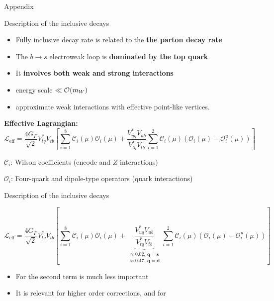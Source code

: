 \documentclass[xcolor=dvipsnames]{beamer}
\begin{document}
\begin{frame}

   \centering\Large

   Appendix

\end{frame}

\begin{frame}{Description of the inclusive decays}
   \scriptsize

   \begin{itemize}
      \item Fully inclusive decay rate is related to the \textbf{the parton decay rate}
      \item The $b\to s$ electroweak loop is \textbf{dominated by the top quark} 
      \item It \textbf{involves both weak and strong interactions}
      \item[\ra] energy scale $\ll{\ensuremath{\cal O}}(m_W)$
      \item[\ra] approximate weak interactions with effective point-like vertices.
   \end{itemize}

   \textbf{Effective Lagrangian:}
   \begin{equation}\nonumber
      \mathcal{L}_{\mathrm{eff}} = \frac{4G_F}{\sqrt{2}}V_{tq}^*V_{tb}\left[\sum^{8}_{i=1}\mathcal{C}_i(\mu)\mathcal{O}_i(\mu)
                                                  + \frac{V^*_{uq}V_{ub}}{V^*_{tq}V_{tb}}\sum^{2}_{i=1}\mathcal{C}_i(\mu)(\mathcal{O}_i(\mu)-\mathcal{O}_i^u(\mu))\right]
  \end{equation}

  \vspace{10pt}

  $\mathcal{C}_i$: Wilson coefficients (encode \Wpm and $Z$ interactions)
  
  $\mathcal{O}_i$: Four-quark and dipole-type operators (quark interactions)

\end{frame}

\begin{frame}{Description of the inclusive decays}
   \scriptsize

   \begin{equation}\nonumber
      \mathcal{L}_{\mathrm{eff}} = \frac{4G_F}{\sqrt{2}}V_{tq}^*V_{tb}\left[\sum^{8}_{i=1}\mathcal{C}_i(\mu)\mathcal{O}_i(\mu)
                                                  + {\underbrace{\frac{V^*_{uq}V_{ub}}{V^*_{tq}V_{tb}}}_{\substack{\approx 0.02,~\mathbf{q = s}\\\approx 0.47,~\mathbf{q = d}}}}\sum^{2}_{i=1}\mathcal{C}_i(\mu)(\mathcal{O}_i(\mu)-\mathcal{O}_i^u(\mu))\right]
   \end{equation}

\begin{itemize}
   \item For \btosgamma the second term is much less important
   \item It is relevant for higher order corrections, and for \btodgamma
\end{itemize}

\end{frame}
\end{document}
